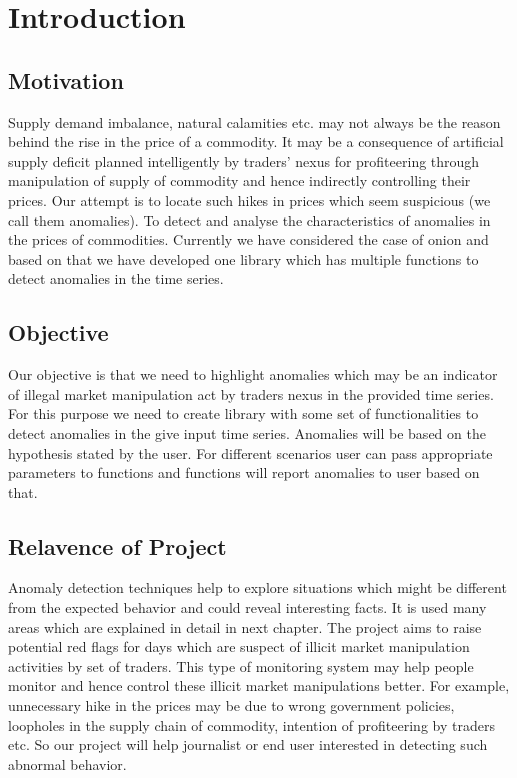 \chapter{Introduction}


\section{Motivation}

Supply demand imbalance, natural calamities etc. may not always be the reason behind the rise in the price of a commodity. ​It may be a consequence of artificial supply deficit planned intelligently by traders’ nexus for profiteering through manipulation of supply of commodity and hence indirectly controlling their prices. ​Our attempt is to locate such hikes in prices which seem suspicious (we call them anomalies).​ To detect and analyse the characteristics of anomalies in the prices of commodities. Currently we have considered the case of onion and based on that we have developed one library which has multiple functions to detect anomalies in the time series.


\section{Objective}

Our objective is that we need to highlight anomalies which may be an indicator of illegal market manipulation act by traders nexus in the provided time series. For this purpose we need to create library with some set of functionalities to detect anomalies in the give input time series. Anomalies will be based on the hypothesis stated by the user. For different scenarios user can pass appropriate parameters to functions and functions will report anomalies to user based on that.


\section{Relavence of Project}

Anomaly detection techniques help to explore situations which might be different from the expected behavior and could reveal interesting facts. It is used many areas which are explained in detail in next chapter. The project aims to raise potential red flags for days which are suspect of illicit market manipulation activities by set of traders. This type of monitoring system may help people monitor and hence control these illicit market manipulations better.
For example, unnecessary hike in the prices may be due to wrong government policies, loopholes in the supply chain of commodity, intention of profiteering by traders etc. So our project will help journalist or end user interested in detecting such abnormal behavior.
